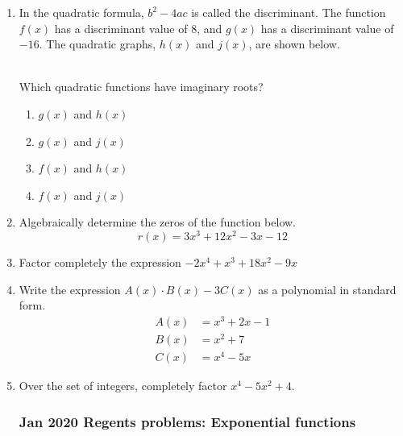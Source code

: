 \documentclass[12pt, twoside]{article}
\begin{document}
\begin{enumerate}[itemsep=0.5cm]
\item In the quadratic formula, $b^2-4ac$ is called the discriminant. The function $f(x)$ has a discriminant value of 8, and $g(x)$ has a discriminant value of $-16$. The quadratic graphs, $h(x)$ and $j(x)$, are shown below. \\
 \;
 \\
Which quadratic functions have imaginary roots?
\begin{enumerate}
    \item $g(x)$ and $h(x)$
    \item $g(x)$ and $j(x)$
    \item $f(x)$ and $h(x)$
    \item $f(x)$ and $j(x)$
\end{enumerate}

\item Algebraically determine the zeros of the function below. %
$$r(x) = 3x^3+12x^2-3x-12$$

\item Factor completely the expression $-2x^4 + x^3 + 18x^2 - 9x$

\item Write the expression $A(x) \cdot B(x) - 3C(x)$ as a polynomial in standard form. %
    \begin{align*}
        A(x) &= x^3 + 2x - 1 \\
        B(x) &= x^2 + 7 \\
        C(x) &= x^4 - 5x
    \end{align*}

\item Over the set of integers, completely factor $x^4-5x^2+4$.

\newpage
\subsubsection*{Jan 2020 Regents problems: Exponential functions}


\end{enumerate}
\end{document}
